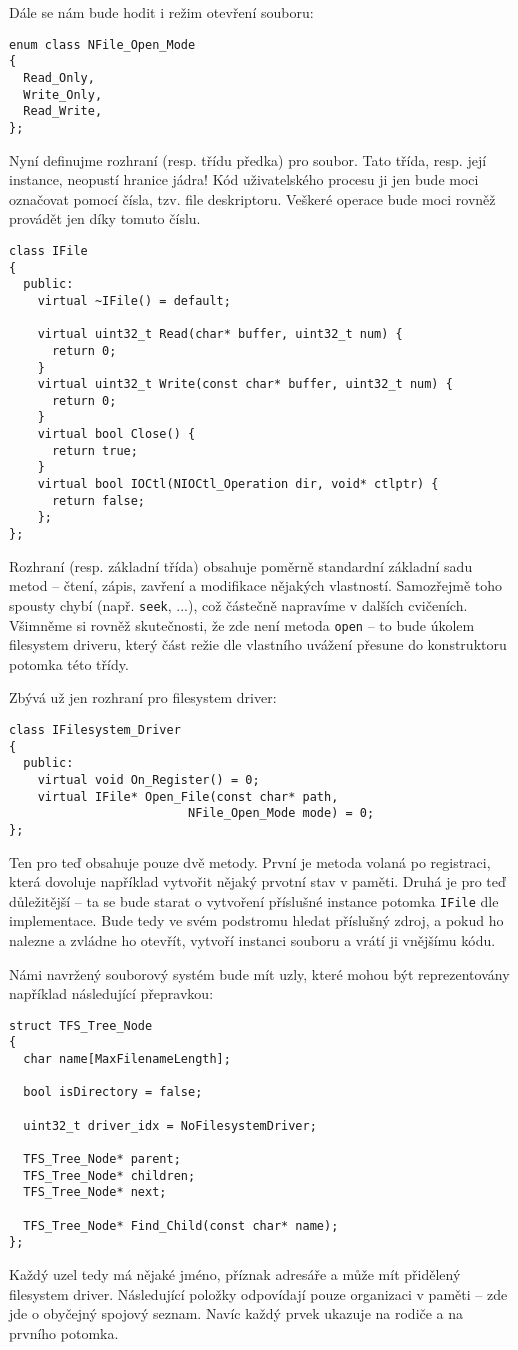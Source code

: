 \documentclass{article}
\begin{document}
Dále se nám bude hodit i režim otevření souboru:
\begin{lstlisting}
enum class NFile_Open_Mode
{
  Read_Only,
  Write_Only,
  Read_Write,
};
\end{lstlisting}
Nyní definujme rozhraní (resp. třídu předka) pro soubor. Tato třída, resp. její instance, neopustí hranice jádra! Kód uživatelského procesu ji jen bude moci označovat pomocí čísla, tzv. file deskriptoru. Veškeré operace bude moci rovněž provádět jen díky tomuto číslu.
\begin{lstlisting}
class IFile
{
  public:
    virtual ~IFile() = default;
	
    virtual uint32_t Read(char* buffer, uint32_t num) {
      return 0;
    }
    virtual uint32_t Write(const char* buffer, uint32_t num) {
      return 0;
    }
    virtual bool Close() {
      return true;
    }
    virtual bool IOCtl(NIOCtl_Operation dir, void* ctlptr) {
      return false;
    };
};
\end{lstlisting}
Rozhraní (resp. základní třída) obsahuje poměrně standardní základní sadu metod -- čtení, zápis, zavření a modifikace nějakých vlastností. Samozřejmě toho spousty chybí (např. \texttt{seek}, ...), což částečně napravíme v dalších cvičeních. Všimněme si rovněž skutečnosti, že zde není metoda \texttt{open} -- to bude úkolem filesystem driveru, který část režie dle vlastního uvážení přesune do konstruktoru potomka této třídy.

Zbývá už jen rozhraní pro filesystem driver:
\begin{lstlisting}
class IFilesystem_Driver
{
  public:
    virtual void On_Register() = 0;
    virtual IFile* Open_File(const char* path,
                         NFile_Open_Mode mode) = 0;
};
\end{lstlisting}
Ten pro teď obsahuje pouze dvě metody. První je metoda volaná po registraci, která dovoluje například vytvořit nějaký prvotní stav v paměti. Druhá je pro teď důležitější -- ta se bude starat o vytvoření příslušné instance potomka \texttt{IFile} dle implementace. Bude tedy ve svém podstromu hledat příslušný zdroj, a pokud ho nalezne a zvládne ho otevřít, vytvoří instanci souboru a vrátí ji vnějšímu kódu.

Námi navržený souborový systém bude mít uzly, které mohou být reprezentovány například následující přepravkou:
\begin{lstlisting}
struct TFS_Tree_Node
{
  char name[MaxFilenameLength];
	
  bool isDirectory = false;
	
  uint32_t driver_idx = NoFilesystemDriver;
	
  TFS_Tree_Node* parent;
  TFS_Tree_Node* children;
  TFS_Tree_Node* next;

  TFS_Tree_Node* Find_Child(const char* name);
};
\end{lstlisting}
Každý uzel tedy má nějaké jméno, příznak adresáře a může mít přidělený filesystem driver. Následující položky odpovídají pouze organizaci v paměti -- zde jde o obyčejný spojový seznam. Navíc každý prvek ukazuje na rodiče a na prvního potomka.
\end{document}
